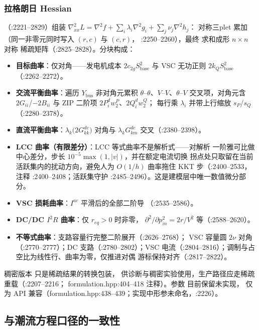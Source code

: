 \subsubsection*{拉格朗日 Hessian}
（:2221--2829）组装
$\nabla^2_{xx}L=\nabla^2f+\sum_i\lambda_i\nabla^2g_i+\sum_j\nu_j\nabla^2h_j$：
对称三plet 累加（同一非零元同时写入 $(r,c)$ 与 $(c,r)$，
:2250--2260），最终  求和成形 $n\times n$ 对称
稀疏矩阵（:2825--2828）。分块构成：

\begin{itemize}
\item \textbf{目标曲率}：仅对角——发电机成本 $2c_{2g}S_{\mathrm{base}}^2$
  与 VSC 无功正则 $2k_QS_{\mathrm{base}}^2$（:2262--2272）。
\item \textbf{交流平衡曲率}：遍历 $Y_{\mathrm{bus}}$ 非对角元累积
  $\theta$--$\theta$、$V$--$V$、$\theta$--$V$ 交叉项，对角元含
  $2G_{ii}$/$-2B_{ii}$ 与 ZIP 二阶项 $2P^d_iw^{P}_2$、$2Q^d_iw^{Q}_2$；
  每行乘 $\lambda_i$ 并带上行缩放 $s_P$/$s_Q$（:2280--2378）。
\item \textbf{直流平衡曲率}：$\lambda_k\big(2G^{dc}_{kk}\big)$ 对角与
  $\lambda_kG^{dc}_{km}$ 交叉（:2380--2398）。
\item \textbf{LCC 曲率（有限差分）}：LCC 等式曲率不是解析式——对解析
  一阶雅可比做中心差分，步长 $10^{-5}\max(1,|v|)$，并在额定电流切换
  拐点处只取留在当前活跃集内的扰动方向，避免人为 $O(1/h)$ 曲率拖住
  KKT 步（:2400--2533，注释 :2400--2408；活跃集守护
  :2485--2496）。这是建模层中唯一数值微分部分。
\item \textbf{VSC 损耗曲率}：$I^{ac}$ 平滑后的全部二阶导
  （:2535--2586）。
\item \textbf{DC/DC $I^2R$ 曲率}：仅 $r_{eq}>0$ 时非零，
  $\partial^2/\partial p_{in}^2=2r/V^2$ 等（:2588--2620）。
\item \textbf{不等式曲率}：支路容量行完整二阶展开（:2626--2768）；
  VSC 容量圆 $2\nu$ 对角（:2770--2777）；DC 支路（:2780--2802）；VSC
  电流（:2804--2816）；调制与占空比为线性行、曲率为零，仅推进对偶
  游标保持对齐（:2817--2822）。
\end{itemize}

稠密版本  只是稀疏结果的转换包装，
供诊断与稠密实验使用，生产路径应走稀疏重载（:2207--2216；
formulation.hpp:404--418 注释）。参数  目前保留未实现，
仅为 API 兼容（formulation.hpp:438--439；实现中形参未命名，:2226）。

\subsection{与潮流方程口径的一致性}\label{subsec:parity-pf-consistency}

